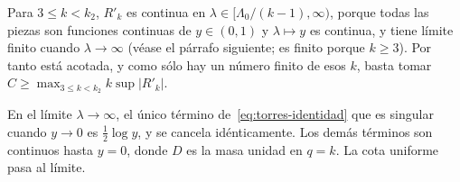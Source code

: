 Para $3\le k<k_2$, $R'_k$ es continua en $\lambda\in[\Lambda_0/(k-1),\infty)$, porque todas las piezas son
funciones continuas de $y\in(0,1)$ y $\lambda\mapsto y$ es continua, y tiene límite finito cuando
$\lambda\to\infty$ (véase el párrafo siguiente; es finito porque $k\ge3$). Por tanto está acotada, y como
sólo hay un número finito de esos $k$, basta tomar $C\ge\max_{3\le k<k_2}k\sup|R'_k|$.

En el límite $\lambda\to\infty$, el único término de~\eqref{eq:torres-identidad} que es singular cuando
$y\to0$ es $\frac12\log y$, y se cancela idénticamente. Los demás términos son continuos hasta $y=0$, donde
$D$ es la
masa unidad en $q=k$. La cota uniforme pasa al límite.

